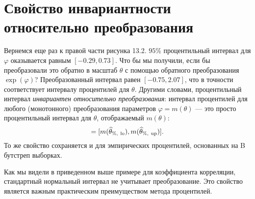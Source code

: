 \section{Свойство инвариантности относительно преобразования}
Вернемся еще раз к правой части рисунка 13.2. $95\%$ процентильный интервал для $\varphi$ оказывается равным $[-0.29, 0.73]$. Что бы мы получили, если бы преобразовали это обратно в масштаб $\theta$ с помощью обратного преобразования $\exp(\varphi)$? Преобразованный интервал равен $[-0.75, 2.07]$, что в точности соответствует интервалу процентилей для $\theta$. Другими словами, процентильный интервал \textit{инвариантен относительно преобразования}: интервал процентилей для любого (монотонного) преобразования параметров $\varphi = m(\theta)$ --- это просто процентильный интервал для $\theta$, отображаемый $m(\theta)$:
\begin{gather}
    [\what{\varphi}_{\%,\ \text{lo}}, \what{\varphi}_{\%,\ \text{up}}] = 
    [m(\what{\theta}_{\%,\ \text{lo}}), m(\what{\theta}_{\%,\ \text{up}})].  
\end{gather}
То же свойство сохраняется и для эмпирических процентилей, основанных на B бутстреп выборках.

Как мы видели в приведенном выше примере для коэффициента корреляции, 
стандартный нормальный интервал не учитывает преобразование. 
Это свойство является важным практическим преимуществом метода процентилей.